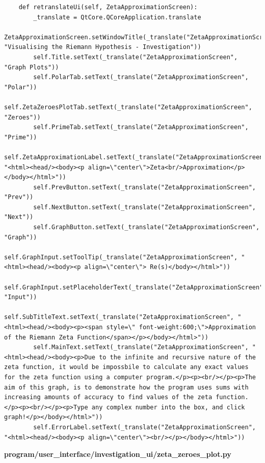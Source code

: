 \documentclass{article}
\begin{document}
\begin{lstlisting}
    def retranslateUi(self, ZetaApproximationScreen):
        _translate = QtCore.QCoreApplication.translate
        ZetaApproximationScreen.setWindowTitle(_translate("ZetaApproximationScreen", "Visualising the Riemann Hypothesis - Investigation"))
        self.Title.setText(_translate("ZetaApproximationScreen", "Graph Plots"))
        self.PolarTab.setText(_translate("ZetaApproximationScreen", "Polar"))
        self.ZetaZeroesPlotTab.setText(_translate("ZetaApproximationScreen", "Zeroes"))
        self.PrimeTab.setText(_translate("ZetaApproximationScreen", "Prime"))
        self.ZetaApproximationLabel.setText(_translate("ZetaApproximationScreen", "<html><head/><body><p align=\"center\">Zeta<br/>Approximation</p></body></html>"))
        self.PrevButton.setText(_translate("ZetaApproximationScreen", "Prev"))
        self.NextButton.setText(_translate("ZetaApproximationScreen", "Next"))
        self.GraphButton.setText(_translate("ZetaApproximationScreen", "Graph"))
        self.GraphInput.setToolTip(_translate("ZetaApproximationScreen", "<html><head/><body><p align=\"center\"> Re(s)</body></html>"))
        self.GraphInput.setPlaceholderText(_translate("ZetaApproximationScreen", "Input"))
        self.SubTitleText.setText(_translate("ZetaApproximationScreen", "<html><head/><body><p><span style=\" font-weight:600;\">Approximation of the Riemann Zeta Function</span></p></body></html>"))
        self.MainText.setText(_translate("ZetaApproximationScreen", "<html><head/><body><p>Due to the infinite and recursive nature of the zeta function, it would be impossbile to calculate any exact values for the zeta function using a computer program.</p><p><br/></p><p>The aim of this graph, is to demonstrate how the program uses sums with increasing amounts of accuracy to find values of the zeta function.</p><p><br/></p><p>Type any complex number into the box, and click graph!</p></body></html>"))
        self.ErrorLabel.setText(_translate("ZetaApproximationScreen", "<html><head/><body><p align=\"center\"><br/></p></body></html>"))
\end{lstlisting}


\textbf{program/user\_interface/investigation\_ui/zeta\_zeroes\_plot.py}
\end{document}
